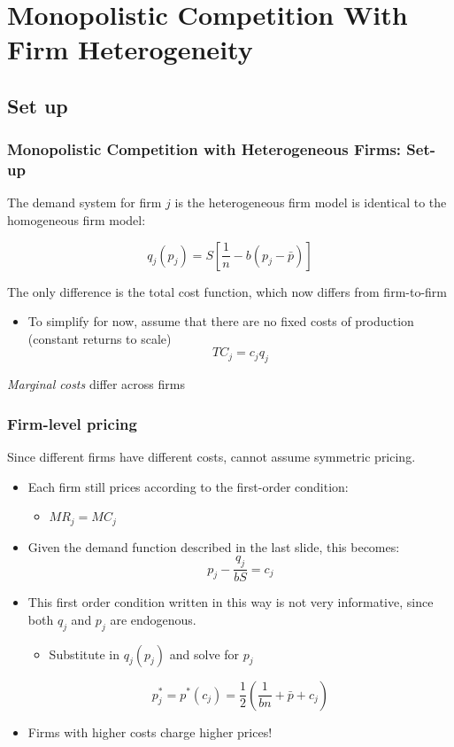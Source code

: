 \documentclass{beamer}
\begin{document}
\section{Monopolistic Competition With Firm Heterogeneity}
\subsection{Set up}
\begin{frame}
	\frametitle{Monopolistic Competition with Heterogeneous Firms: Set-up}
	
The demand system for firm $j$ is the heterogeneous firm model is identical to the homogeneous firm model:

\begin{equation}
q_j(p_j)=S\left[\frac{1}{n} - b\left(p_j -\bar{p} \right)\right] \nonumber
\end{equation}

The only difference is the total cost function, which now differs from firm-to-firm

\begin{itemize}
	\item To simplify for now, assume that there are no fixed costs of production (constant returns to scale)
	\begin{equation}
	TC_j=c_jq_j		\nonumber
	\end{equation}
\end{itemize}

\emph{Marginal costs} differ across firms
		
\end{frame}

\begin{frame}
	\frametitle{Firm-level pricing}
Since different firms have different costs, cannot assume symmetric pricing.
\begin{itemize}
	\item Each firm still prices according to the first-order condition:
		\begin{itemize}
			\item $MR_j=MC_j$
		\end{itemize}
	\item Given the demand function described in the last slide, this becomes:
	\begin{equation}
	p_{j}-\frac{q_{j}}{bS}=c_j \nonumber
	\end{equation}
	\item This first order condition written in this way is not very informative, since both $q_j$ and $p_j$ are endogenous.
		\begin{itemize}
			\item Substitute in $q_j(p_j)$ and solve for $p_j$
		\end{itemize}
		
		\begin{equation}
		p_j^*=p^*(c_j)=\frac{1}{2}\left(\frac{1}{bn}+\bar{p} + c_j\right) \nonumber 
		\end{equation}
	\item Firms with higher costs charge higher prices!
\end{itemize}
\end{frame}
\end{document}
